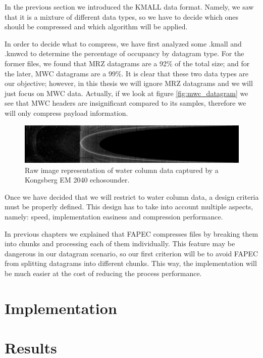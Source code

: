 In the previous section we introduced the KMALL data format. Namely, we saw that it is a mixture of different data types, so we have to decide which ones should be compressed and which algorithm will be applied.

In order to decide what to compress, we have first analyzed some .kmall and .kmwcd to determine the percentage of occupancy by datagram type. For the former files, we found that MRZ datagrams are a 92\% of the total size; and for the later, MWC datagrams are a 99\%. It is clear that these two data types are our objective; however, in this thesis we will ignore MRZ datagrams and we will just focus on MWC data. Actually, if we look at figure \ref{fig:mwc_datagram} we see that MWC headers are insignificant compared to its samples, therefore we will only compress payload information.

\begin{figure}[h!]
	\begin{center}
		\includegraphics[scale=0.3]{images/water_column_data.png}
	\end{center}
	\caption{Raw image representation of water column data captured by a Kongsberg EM 2040 echosounder.}
	\label{fig:wc_data}
\end{figure}

Once we have decided that we will restrict to water column data, a design criteria must be properly defined. This design has to take into account multiple aspects, namely: speed, implementation easiness and compression performance.

In previous chapters we explained that FAPEC compresses files by breaking them into chunks and processing each of them individually. This feature may be dangerous in our datagram scenario, so our first criterion will be to avoid FAPEC from splitting datagrams into different chunks. This way, the implementation will be much easier at the cost of reducing the process performance.

\section{Implementation}

\section{Results}

